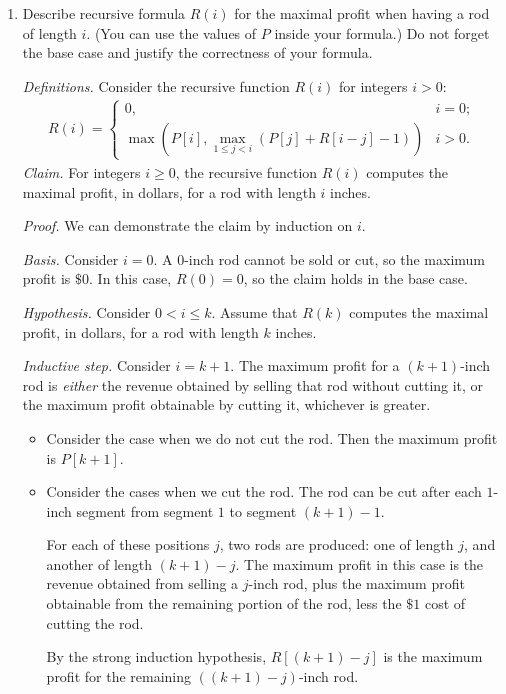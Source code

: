 \begin{enumerate}
\item Describe recursive formula $R(i)$ for the maximal profit when having a rod of length $i$. (You can use the values of $P$ inside your formula.) Do not forget the base case and justify the correctness of your formula.
\begin{solution}
\textit{Definitions. }Consider the recursive function $R(i)$ for integers $i>0$:
\begin{align*}
R(i)= 
\begin{cases} 
    0,&i=0;\\
    \max\left(P[i],\underset{1\leq j<i}{\max}\left(P[j]+R[i-j]-1\right)\right)&i>0.
\end{cases}
\end{align*}
\textit{Claim. }For integers $i\geq 0$, the recursive function $R(i)$ computes the maximal profit, in dollars, for a rod with length $i$ inches.

\textit{Proof. }We can demonstrate the claim by induction on $i$.

\textit{Basis. }Consider $i=0$. A $0$-inch rod cannot be sold or cut, so the maximum profit is $\$0$. In this case, $R(0)=0$, so the claim holds in the base case.

\textit{Hypothesis. }Consider $0<i\leq k$. Assume that $R(k)$ computes the maximal profit, in dollars, for a rod with length $k$ inches.

\textit{Inductive step. }Consider $i=k+1$. The maximum profit for a $(k+1)$-inch rod is \textit{either} the revenue obtained by selling that rod without cutting it, or the maximum profit obtainable by cutting it, whichever is greater.

\begin{itemize}
\item Consider the case when we do not cut the rod. Then the maximum profit is $P[k+1]$.
\item Consider the cases when we cut the rod. The rod can be cut after each $1$-inch segment from segment $1$ to segment $(k+1)-1$.

For each of these positions $j$, two rods are produced: one of length $j$, and another of length $(k+1)-j$. The maximum profit in this case is the revenue obtained from selling a $j$-inch rod, plus the maximum profit obtainable from the remaining portion of the rod, less the $\$1$ cost of cutting the rod.

By the strong induction hypothesis, $R[(k+1)-j]$ is the maximum profit for the remaining $((k+1)-j)$-inch rod.


\end{itemize}
\end{solution}
\end{enumerate}
